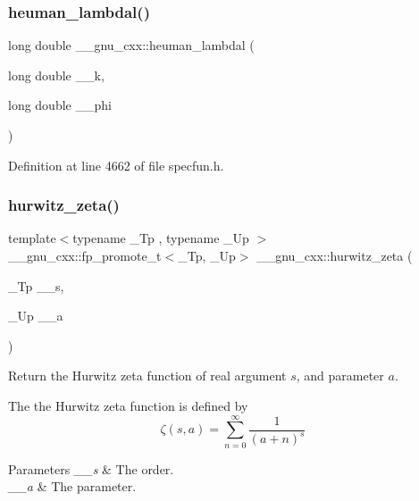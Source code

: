 \subsubsection{\texorpdfstring{heuman\+\_\+lambdal()}{heuman\_lambdal()}}
{\footnotesize\ttfamily long double \+\_\+\+\_\+gnu\+\_\+cxx\+::heuman\+\_\+lambdal (\begin{DoxyParamCaption}\item[{long double}]{\+\_\+\+\_\+k,  }\item[{long double}]{\+\_\+\+\_\+phi }\end{DoxyParamCaption})\hspace{0.3cm}{\ttfamily [inline]}}



Definition at line 4662 of file specfun.\+h.

\mbox{\label{group__gnu__math__spec__func_ga7b167ce1c8d9aa6aad40fc83a95733bd}} 
\subsubsection{\texorpdfstring{hurwitz\+\_\+zeta()}{hurwitz\_zeta()}\hspace{0.1cm}{\footnotesize\ttfamily [1/2]}}
{\footnotesize\ttfamily template$<$typename \+\_\+\+Tp , typename \+\_\+\+Up $>$ \\
\+\_\+\+\_\+gnu\+\_\+cxx\+::fp\+\_\+promote\+\_\+t$<$\+\_\+\+Tp, \+\_\+\+Up$>$ \+\_\+\+\_\+gnu\+\_\+cxx\+::hurwitz\+\_\+zeta (\begin{DoxyParamCaption}\item[{\+\_\+\+Tp}]{\+\_\+\+\_\+s,  }\item[{\+\_\+\+Up}]{\+\_\+\+\_\+a }\end{DoxyParamCaption})\hspace{0.3cm}{\ttfamily [inline]}}

Return the Hurwitz zeta function of real argument $ s $, and parameter $ a $.

The the Hurwitz zeta function is defined by \[ \zeta(s, a) = \sum_{n=0}^{\infty}\frac{1}{(a + n)^s} \]


\begin{DoxyParams}{Parameters}
{\em \+\_\+\+\_\+s} & The order. \\
\hline
{\em \+\_\+\+\_\+a} & The parameter. \\
\hline
\end{DoxyParams}


